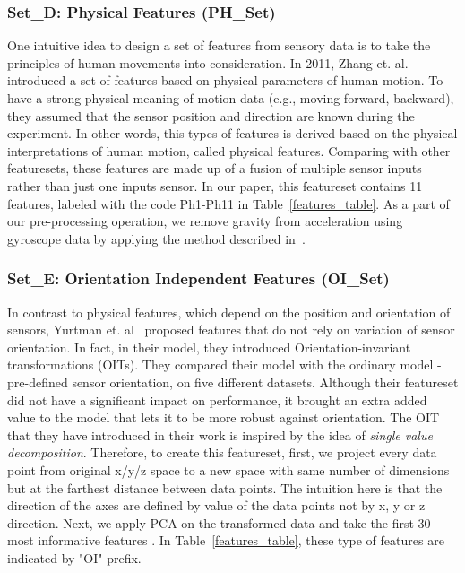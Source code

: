 \documentclass[journal,article,submit,moreauthors,pdftex]{Definitions/mdpi}
\begin{document}
\subsubsection{Set\_D: Physical Features (PH\_Set)}
One intuitive idea to design a set of features from sensory data is to take the principles of human movements into consideration. In 2011, Zhang et. al. ~\cite{zhang2011feature} introduced a set of features based on physical parameters of human motion. To have a strong physical meaning of motion data (e.g., moving forward, backward), they assumed that the sensor position and direction are known during the experiment. In other words, this types of features is derived based on the physical interpretations of human motion, called physical features. Comparing with other featuresets, these features are made up of a fusion of multiple sensor inputs rather than just one inputs sensor. In our paper, this featureset contains 11 features, labeled with the code Ph1-Ph11 in Table~\ref{features_table}. As a part of our pre-processing operation, we remove gravity from acceleration using gyroscope data by applying the method described in~\cite{Accelero5:online}.

\subsubsection{Set\_E: Orientation Independent Features (OI\_Set)}
In contrast to physical features, which depend on the position and orientation of sensors, Yurtman et. al~\cite{yurtman2017activity} proposed features that do not rely on variation of sensor orientation. In fact, in their model, they introduced Orientation-invariant transformations (OITs). They compared their model with the ordinary model - pre-defined sensor orientation, on five different datasets. Although their featureset did not have a significant impact on performance, it brought an extra added value to the model that lets it to be more robust against orientation. The OIT that they have introduced in their work is inspired by the idea of \textit{single value decomposition}\cite{moon2000mathematical}. Therefore, to create this featureset, first, we project every data point from original x/y/z space to a new space with same number of dimensions but at the farthest distance between data points. The intuition here is that the direction of the axes are defined by value of the data points not by x, y or z direction. Next, we apply PCA on the transformed data and take the first 30 most informative features \cite{janidarmian2017comprehensive}. In Table~\ref{features_table}, these type of features  are indicated by "OI" prefix.
\end{document}
